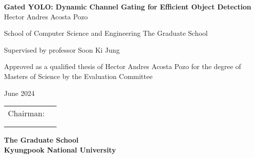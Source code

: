 \begin{titlepage}
    \begin{center}
        \textbf{\huge Gated YOLO: Dynamic Channel Gating for Efficient Object Detection \newline}  
        \textnormal{\Large Hector Andres Acosta Pozo}
        
        
        \textnormal{\large School of Computer Science and Engineering\newline}
        \textnormal{\large The Graduate School} 
        
        \textnormal{\large Supervised by professor Soon Ki Jung}
        
        \textnormal{\large Approved as a qualified thesis of Hector Andres Acosta Pozo \newline }
        \textnormal{\large for the degree of Masters of Science\newline}
        \textnormal{\large by the Evaluation Committee \newline}
        
        \textnormal{\large June 2024}
        
        \begin{flushright}
        	\begin{tabular}{cl}
            \textnormal{Chairman}:	    & \underline{\makebox[2in][l]{Prof. Seok Joo Koh}}\\ 
             							& \underline{\makebox[2in][l]{Prof. Soon Ki Jung}}\\  
             							& \underline{\makebox[2in][l]{Prof. Yongtae Kim}}\\ 
                                                                                
            \end{tabular}
        \end{flushright}
        \vfill 
        
       \textbf{\Large The Graduate School \\ Kyungpook National University}
        \vfill               
    \end{center}
\end{titlepage}